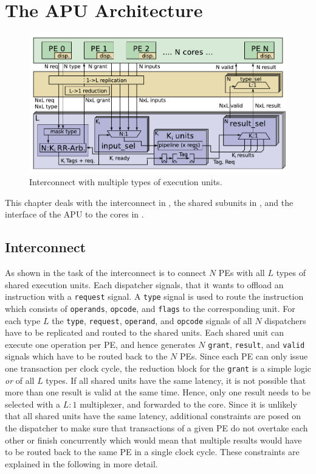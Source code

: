 \documentclass[%
 oneside,      %
 openany,      %
 halfparskip,  %
]{scrbook}
\begin{document}
\chapter{The APU Architecture}\label{ch:apuarchi}

\begin{figure}[t]
\centering
  \includegraphics[width=1\linewidth]{figures/interconnect.pdf}
  \caption{Interconnect with multiple types of execution units.}
  \label{fig_apu:interconnect}
\end{figure}

This chapter deals with the interconnect in , the shared subunits in , and the interface of the APU to the cores in .

\section{Interconnect}\label{interconnect}
As shown in  the task of the interconnect is to connect $N$ PEs with all $L$ types of shared execution units. Each dispatcher signals, that it wants to offload an instruction with a \texttt{request} signal. A \texttt{type} signal is used to route the instruction which consists of \texttt{operands}, \texttt{opcode}, and \texttt{flags} to the corresponding unit. For each type $L$ the \texttt{type}, \texttt{request}, \texttt{operand}, and \texttt{opcode} signals of all $N$ dispatchers have to be replicated and routed to the shared units. Each shared unit can execute one operation per PE, and hence generates $N$ \texttt{grant}, \texttt{result}, and \texttt{valid} signals which have to be routed back to the $N$ PEs. Since each PE can only issue one transaction per clock cycle, the reduction block for the \texttt{grant} is a simple logic \emph{or} of all $L$ types.
If all shared units have the same latency, it is not possible that more than one result is valid at the same time. Hence, only one result needs to be selected with a $L:1$ multiplexer, and forwarded to the core.
Since it is unlikely that all shared units have the same latency, additional constraints are posed on the dispatcher to make sure that transactions of a given PE do not overtake each other or finish concurrently which would mean that multiple results would have to be routed back to the same PE in a single clock cycle. These constraints are explained in the following in more detail.
\end{document}
